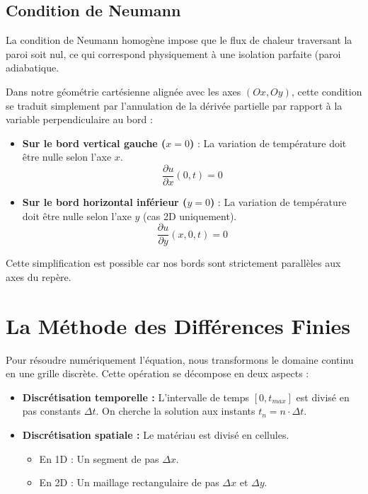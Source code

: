 \documentclass[a4paper,12pt]{article}
\begin{document}
\subsection{Condition de Neumann}
La condition de Neumann homogène impose que le flux de chaleur traversant la paroi soit nul, ce qui correspond physiquement à une isolation parfaite (paroi adiabatique.

Dans notre géométrie cartésienne alignée avec les axes $(Ox, Oy)$, cette condition se traduit simplement par l'annulation de la dérivée partielle par rapport à la variable perpendiculaire au bord :

\begin{itemize}
    \item \textbf{Sur le bord vertical gauche ($x=0$)} : La variation de température doit être nulle selon l'axe $x$.
    $$ \frac{\partial u}{\partial x}(0, t) = 0 $$
    
    \item \textbf{Sur le bord horizontal inférieur ($y=0$)} : La variation de température doit être nulle selon l'axe $y$ (cas 2D uniquement).
    $$ \frac{\partial u}{\partial y}(x, 0, t) = 0 $$
\end{itemize}

Cette simplification est possible car nos bords sont strictement parallèles aux axes du repère.


\section{La Méthode des Différences Finies}

Pour résoudre numériquement l'équation, nous transformons le domaine continu en une grille discrète. Cette opération se décompose en deux aspects :

\begin{itemize}
    \item \textbf{Discrétisation temporelle :} L'intervalle de temps $[0, t_{max}]$ est divisé en pas constants $\Delta t$. On cherche la solution aux instants $t_n = n \cdot \Delta t$.
    \item \textbf{Discrétisation spatiale :} Le matériau est divisé en cellules.
    \begin{itemize}
        \item En 1D : Un segment de pas $\Delta x$.
        \item En 2D : Un maillage rectangulaire de pas $\Delta x$ et $\Delta y$.
    \end{itemize}
\end{itemize}
\end{document}
